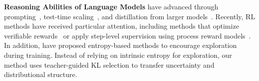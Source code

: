 \textbf{Reasoning Abilities of Language Models} have advanced through prompting~\cite{wei2022chain, yao2023tree}, test-time scaling~\cite{muennighoff2025s1, snell2024scaling}, and distillation from larger models~\cite{guha2025openthoughts, he2025deepmath, guo2025deepseek}.
Recently, RL methods have received particular attention, including methods that optimize verifiable rewards~\cite{shao2024deepseekmath, yu2025dapo, liu2503understanding} or apply step-level supervision using process reward models~\cite{uesato2022solving, lightman2023let}. In addition, \citet{cheng2025reasoning, wang2025beyond} have proposed entropy-based methods to encourage exploration during training. 
Instead of relying on intrinsic entropy for exploration, our method uses teacher-guided KL selection to transfer uncertainty and distributional structure.
